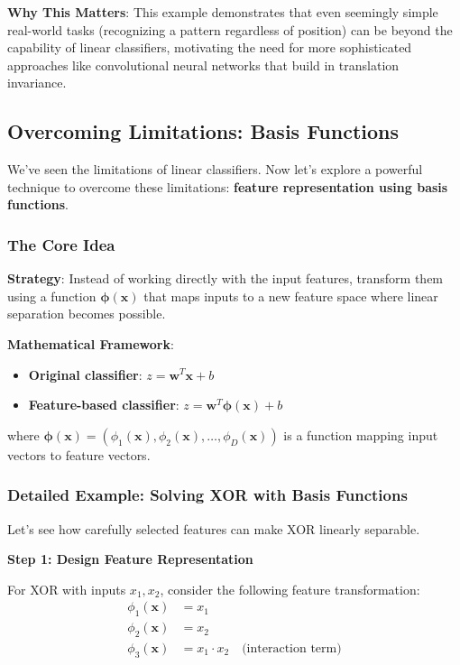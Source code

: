 \textbf{Why This Matters}: This example demonstrates that even seemingly simple real-world tasks (recognizing a pattern regardless of position) can be beyond the capability of linear classifiers, motivating the need for more sophisticated approaches like convolutional neural networks that build in translation invariance.

\subsection{Overcoming Limitations: Basis Functions}

We've seen the limitations of linear classifiers. Now let's explore a powerful technique to overcome these limitations: \textbf{feature representation using basis functions}.

\subsubsection{The Core Idea}

\textbf{Strategy}: Instead of working directly with the input features, transform them using a function $\bm{\phi}(\mathbf{x})$ that maps inputs to a new feature space where linear separation becomes possible.

\textbf{Mathematical Framework}:
\begin{itemize}
    \item \textbf{Original classifier}: $z = \mathbf{w}^T \mathbf{x} + b$
    \item \textbf{Feature-based classifier}: $z = \mathbf{w}^T \bm{\phi}(\mathbf{x}) + b$
\end{itemize}

where $\bm{\phi}(\mathbf{x}) = (\phi_1(\mathbf{x}), \phi_2(\mathbf{x}), \ldots, \phi_D(\mathbf{x}))$ is a function mapping input vectors to feature vectors.

\subsubsection{Detailed Example: Solving XOR with Basis Functions}

Let's see how carefully selected features can make XOR linearly separable.

\textbf{Step 1: Design Feature Representation}

For XOR with inputs $x_1, x_2$, consider the following feature transformation:
\begin{align}
\phi_1(\mathbf{x}) &= x_1 \\
\phi_2(\mathbf{x}) &= x_2 \\
\phi_3(\mathbf{x}) &= x_1 \cdot x_2 \quad \text{(interaction term)}
\end{align}

